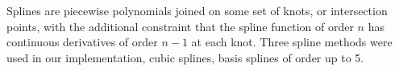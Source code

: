 Splines are piecewise polynomials joined on some set of knots, or intersection points, with the additional constraint that the spline function of order $n$ has continuous derivatives of order
$n-1$ at each knot. Three spline methods were used in our implementation, cubic splines, basis splines of order up to 5.


  
